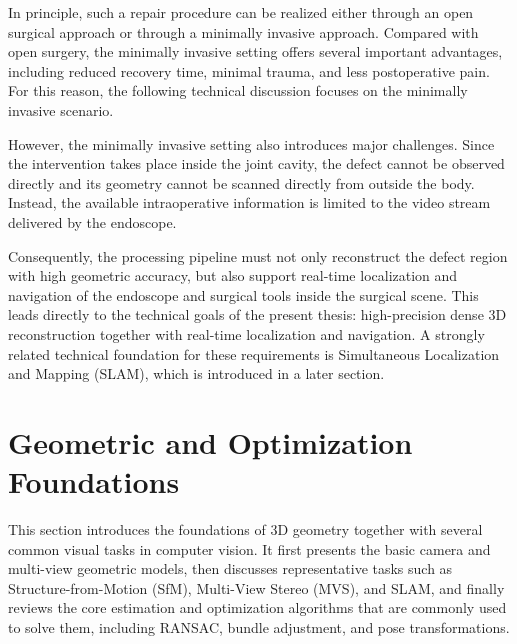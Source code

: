 In principle, such a repair procedure can be realized either through an open surgical approach or through a minimally invasive approach. Compared with open surgery, the minimally invasive setting offers several important advantages, including reduced recovery time, minimal trauma, and less postoperative pain. For this reason, the following technical discussion focuses on the minimally invasive scenario.

However, the minimally invasive setting also introduces major challenges. Since the intervention takes place inside the joint cavity, the defect cannot be observed directly and its geometry cannot be scanned directly from outside the body. Instead, the available intraoperative information is limited to the video stream delivered by the endoscope.  

Consequently, the processing pipeline must not only reconstruct the defect region with high geometric accuracy, but also support real-time localization and navigation of the endoscope and surgical tools inside the surgical scene. This leads directly to the technical goals of the present thesis: high-precision dense 3D reconstruction together with real-time localization and navigation. A strongly related technical foundation for these requirements is Simultaneous Localization and Mapping (SLAM), which is introduced in a later section. 



\section{Geometric and Optimization Foundations}
\label{sec:geometric_foundations}
This section introduces the foundations of 3D geometry together with several common visual tasks in computer vision. It first presents the basic camera and multi-view geometric models, then discusses representative tasks such as Structure-from-Motion (SfM), Multi-View Stereo (MVS), and SLAM, and finally reviews the core estimation and optimization algorithms that are commonly used to solve them, including RANSAC, bundle adjustment, and pose transformations.

